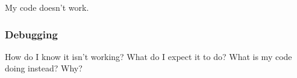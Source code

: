 \documentclass[11pt]{beamer}
\begin{document}
{ 
    \begin{frame}[plain]
        My code doesn’t work.
     \end{frame}
}

\begin{frame}[fragile]
  \frametitle{Debugging}
  \Enlarge

  \begin{enumerate}
  \myitem  How do I know it isn’t working?
  \myitem  What do I expect it to do?
  \myitem  What is my code doing instead? Why?
  \end{enumerate}
\end{frame}
\end{document}
